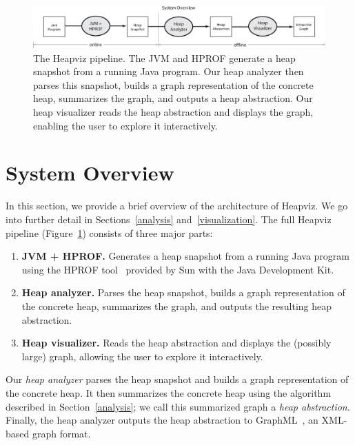 \begin{figure}[t]
  \includegraphics[width=\textwidth]{figs/system-flowchart}
  \caption{The Heapviz pipeline.  The JVM and HPROF generate a heap 
  snapshot from a running Java program.  Our heap analyzer then parses 
  this snapshot, builds a graph representation of the concrete heap, 
  summarizes the graph, and outputs a heap abstraction.  Our heap 
  visualizer reads the heap abstraction and displays the graph, enabling 
  the user to explore it interactively.  }
  \label{fig:pipeline}
\end{figure}

\section{System Overview}

In this section, we provide a brief overview of the architecture of Heapviz.
We go into further detail in Sections~\ref{analysis} and~\ref{visualization}.
The full Heapviz pipeline (Figure~\ref{fig:pipeline}) consists of three major
parts:

\begin{enumerate}

\item \textbf{JVM + HPROF.} Generates a heap snapshot from a running Java
  program using the HPROF tool~\cite{hprof} provided by Sun with the Java
  Development Kit.

\item \textbf{Heap analyzer.} Parses the heap snapshot, builds a graph
  representation of the concrete heap, summarizes the graph, and outputs the
  resulting heap abstraction.

\item \textbf{Heap visualizer.} Reads the heap abstraction and displays the
  (possibly large) graph, allowing the user to explore it interactively.

\end{enumerate}


Our \emph{heap analyzer} parses the heap snapshot and builds a graph
representation of the concrete heap.  It then summarizes the concrete heap
using the algorithm described in Section~\ref{analysis}; we call this
summarized graph a \emph{heap abstraction}.  Finally, the heap analyzer 
outputs the heap abstraction to GraphML~\cite{graphml}, an XML-based 
graph format.


